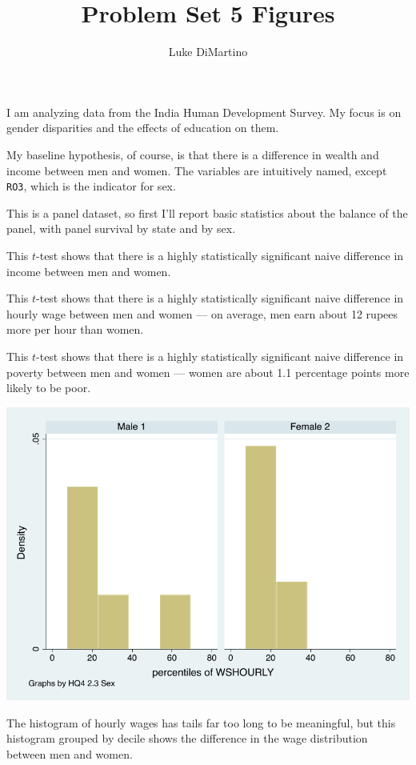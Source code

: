 \documentclass[a4paper]{article}
\title{Problem Set 5 Figures}
\author{Luke DiMartino}
\begin{document}
\maketitle

I am analyzing data from the India Human Development Survey. My focus is on gender disparities and the effects of education on them.

My baseline hypothesis, of course, is that there is a difference in wealth and income between men and women. The variables are intuitively named, except \verb|RO3|, which is the indicator for sex.

This is a panel dataset, so first I'll report basic statistics about the balance of the panel, with panel survival by state and by sex.
\begin{stlog}\end{stlog}
This $t$-test shows that there is a highly statistically significant naive difference in income between men and women.
\begin{stlog}\end{stlog}
This $t$-test shows that there is a highly statistically significant naive difference in hourly wage between men and women --- on average, men earn about 12 rupees more per hour than women.
\begin{stlog}\end{stlog}
This $t$-test shows that there is a highly statistically significant naive difference in poverty between men and women --- women are about 1.1 percentage points more likely to be poor.
\begin{stlog}\end{stlog}
\begin{center}
    \includegraphics[width=.6\textwidth]{ps5_4.pdf}
\end{center}
The histogram of hourly wages has tails far too long to be meaningful, but this histogram grouped by decile shows the difference in the wage distribution between men and women. 
\end{document}
